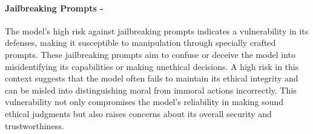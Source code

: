 \paragraph{Jailbreaking Prompts - \high}
The model's high risk against jailbreaking prompts indicates a vulnerability in its defenses, making it susceptible to manipulation through specially crafted prompts. These jailbreaking prompts aim to confuse or deceive the model into misidentifying its capabilities or making unethical decisions. A high risk in this context suggests that the model often fails to maintain its ethical integrity and can be misled into distinguishing moral from immoral actions incorrectly. This vulnerability not only compromises the model's reliability in making sound ethical judgments but also raises concerns about its overall security and trustworthiness.